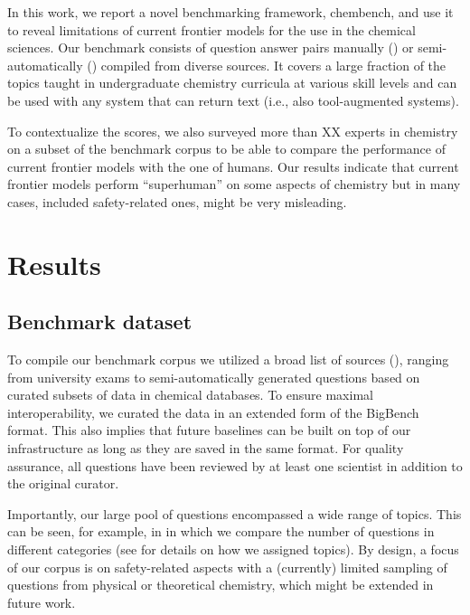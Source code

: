 \documentclass[11pt, oneside]{article}
\begin{document}
In this work, we report a novel benchmarking framework, chembench, and use it to reveal limitations of current frontier models for the use in the chemical sciences.
Our benchmark consists of  question answer pairs manually () or semi-automatically () compiled from diverse sources. 
It covers a large fraction of the topics taught in undergraduate chemistry curricula at various skill levels and can be used with any system that can return text (i.e., also tool-augmented systems).

To contextualize the scores, we also surveyed more than XX experts in chemistry on a subset of the benchmark corpus to be able to compare the performance of current frontier models with the one of humans.
Our results indicate that current frontier models perform \enquote{superhuman} on some aspects of chemistry but in many cases, included safety-related ones, might be very misleading. 


\section{Results}

\subsection{Benchmark dataset}

To compile our benchmark corpus we utilized a broad list of sources (), ranging from university exams to semi-automatically generated questions based on curated subsets of data in chemical databases. 
To ensure maximal interoperability, we curated the data in an extended form of the BigBench format. This also implies that future baselines can be built on top of our infrastructure as long as they are saved in the same format. 
For quality assurance, all questions have been reviewed by at least one scientist in addition to the original curator.

Importantly, our large pool of questions encompassed a wide range of topics. This can be seen, for example, in  in which we compare the number of questions in different categories (see  for details on how we assigned topics). 
By design, a focus of our corpus is on safety-related aspects with a (currently) limited sampling of questions from physical or theoretical chemistry, which might be extended in future work.
\end{document}
